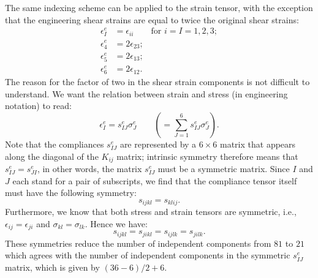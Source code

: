 The same indexing scheme can be applied to the strain tensor, with the exception that the engineering shear strains are equal to twice the original shear strains: 
\begin{subequations}
\begin{align}
	\epsilon^e_I&= \epsilon_{ii}\qquad\mbox{for $i=I=1,2,3$};\nonumber\\
	\epsilon^e_4 &= 2\epsilon_{23};\\
	\epsilon^e_5 &= 2\epsilon_{13};\\
	\epsilon^e_6 &= 2\epsilon_{12}.
\end{align}
\end{subequations}
The reason for the factor of two in the shear strain components is not difficult to understand.  We want the relation between strain and stress (in engineering notation) to read:
\begin{equation}
	\epsilon^e_I= s^e_{IJ} \sigma^e_J \qquad\left(= \sum_{J=1}^6 s^e_{IJ} \sigma^e_J\right).\label{\chabbr:eq:seIJ}
\end{equation}
Note that the compliances $s^e_{IJ}$ are represented by a $6\times 6$ matrix that appears along the diagonal of the $K_{ij}$ matrix; intrinsic symmetry therefore means that $s^e_{IJ}=s^e_{JI}$, in other words, the matrix $s^e_{IJ}$ must be a symmetric matrix.  Since $I$ and $J$ each stand for a pair of subscripts, we find that the compliance tensor itself must have the following symmetry:
\begin{equation}
	s_{ijkl} = s_{klij}.
\end{equation}
Furthermore, we know that both stress and strain tensors are symmetric, i.e., $\epsilon_{ij}=\epsilon_{ji}$ and $\sigma_{kl} = \sigma_{lk}$.  Hence we have:
\[
	s_{ijkl} = s_{jikl} = s_{ijlk} = s_{jilk}.
\]
These symmetries reduce the number of independent components from $81$ to $21$ which agrees with the number of independent components in the symmetric $s^e_{IJ}$ matrix, which is given by $(36-6)/2+6$.  

